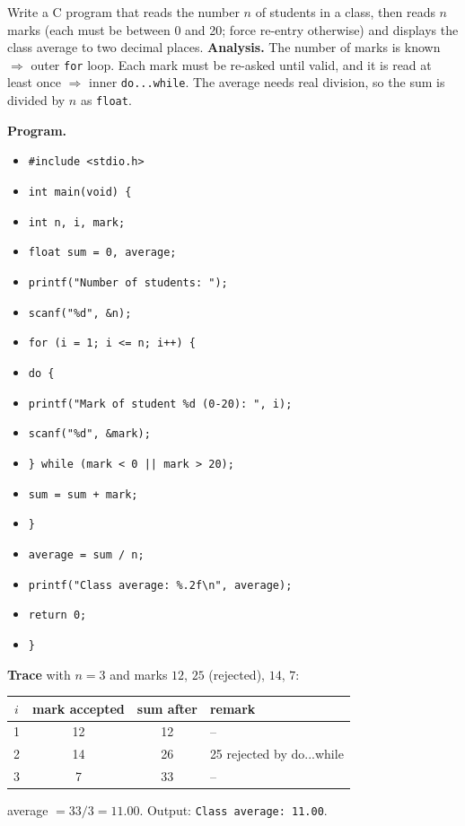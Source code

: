 \documentclass[11pt]{article}
\begin{document}
\begin{exoresolu}
Write a C program that reads the number $n$ of students in a class, then reads $n$ marks (each must be between 0 and 20; force re-entry otherwise) and displays the class average to two decimal places.
\tcblower
\textbf{Analysis.} The number of marks is known $\Rightarrow$ outer \texttt{for} loop. Each mark must be re-asked until valid, and it is read at least once $\Rightarrow$ inner \texttt{do...while}. The average needs real division, so the sum is divided by $n$ as \texttt{float}.

\textbf{Program.}
\begin{itemize}
\item \texttt{\#include <stdio.h>}
\item \texttt{int main(void) \{}
\item \texttt{\quad int n, i, mark;}
\item \texttt{\quad float sum = 0, average;}
\item \texttt{\quad printf("Number of students: ");}
\item \texttt{\quad scanf("\%d", \&n);}
\item \texttt{\quad for (i = 1; i <= n; i++) \{}
\item \texttt{\quad\quad do \{}
\item \texttt{\quad\quad\quad printf("Mark of student \%d (0-20): ", i);}
\item \texttt{\quad\quad\quad scanf("\%d", \&mark);}
\item \texttt{\quad\quad \} while (mark < 0 || mark > 20);}
\item \texttt{\quad\quad sum = sum + mark;}
\item \texttt{\quad \}}
\item \texttt{\quad average = sum / n;}
\item \texttt{\quad printf("Class average: \%.2f\textbackslash n", average);}
\item \texttt{\quad return 0;}
\item \texttt{\}}
\end{itemize}

\textbf{Trace} with $n = 3$ and marks $12$, $25$ (rejected), $14$, $7$:
\begin{center}
\begin{tabular}{|c|c|c|l|}
\hline
\rowcolor{popblueL} $i$ & mark accepted & sum after & remark \\ \hline
1 & 12 & 12 & -- \\ \hline
2 & 14 & 26 & 25 rejected by do...while \\ \hline
3 & 7 & 33 & -- \\ \hline
\end{tabular}
\end{center}
average $= 33 / 3 = 11.00$. Output: \texttt{Class average: 11.00}.


\end{exoresolu}
\end{document}
